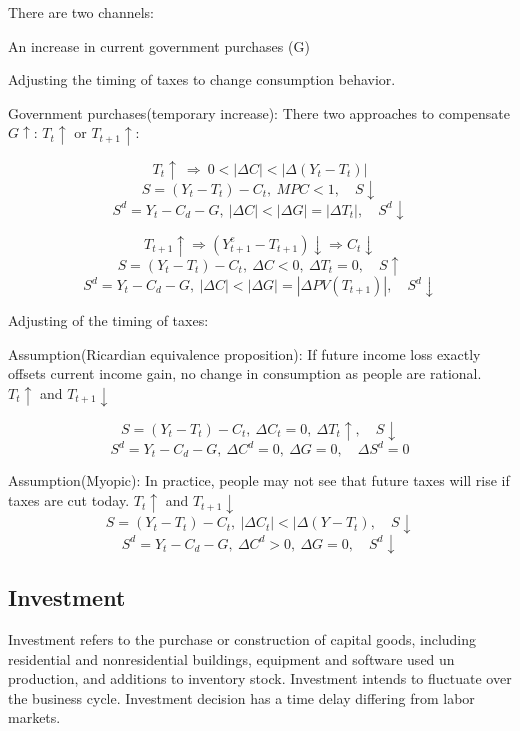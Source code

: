 \documentclass[10pt, a4paper]{article}
\begin{document}
                    There are two channels: 
                    
                    \quad An increase in current government purchases (G) 

                    \quad Adjusting the timing of taxes to change consumption behavior.

                    Government purchases(temporary increase): There two approaches to compensate $G \uparrow$: $T_t \uparrow$ or $T_{t+1} \uparrow$:
                    
                    $$T_t\uparrow \  \Rightarrow \  0 < |\Delta C| < |\Delta (Y_t - T_t)|$$
                        $$S = (Y_t - T_t) - C_t,\ MPC < 1, \quad  S\downarrow$$
                        $$S^d = Y_t - C_d - G,\ |\Delta C| < |\Delta G| = |\Delta T_t|,\quad S^d\downarrow$$


                    $$T_{t+1}\uparrow \Rightarrow (Y_{t+1}^e - T_{t+1})\downarrow \Rightarrow C_t \downarrow$$
                    $$S = (Y_t - T_t) - C_t,\ \Delta C < 0,\ \Delta T_t = 0, \quad   S\uparrow$$
                    $$S^d = Y_t - C_d - G,\ |\Delta C| < |\Delta G| = |\Delta PV(T_{t+1})|,\quad S^d\downarrow$$

                    Adjusting of the timing of taxes: 

                    \quad Assumption(Ricardian equivalence proposition): If future income loss exactly offsets current income gain, no change in consumption as people are rational. $T_t \uparrow$ and $T_{t+1} \downarrow$ 

                    $$S = (Y_t - T_t) - C_t,\ \Delta C_t = 0,\ \Delta T_t \uparrow,\quad  S \downarrow$$
                    $$S^d = Y_t - C_d - G,\ \Delta C^d = 0,\ \Delta G = 0, \quad \Delta S^d = 0$$

                    \quad Assumption(Myopic): In practice, people may  not see that future taxes will rise if taxes are cut today. $T_t \uparrow$ and $T_{t+1} \downarrow$ 
                    $$S = (Y_t - T_t) - C_t,\ |\Delta C_t| < |\Delta (Y - T_t),\quad S\downarrow$$
                    $$S^d = Y_t - C_d - G,\ \Delta C^d > 0,\ \Delta G = 0, \quad S^d\downarrow$$

        \subsection{Investment}
            Investment refers to the purchase or construction of capital goods, including residential and nonresidential buildings, equipment and software used un production, and additions to inventory stock. Investment intends to fluctuate over the business cycle. Investment decision has a time delay differing from labor markets. 
\end{document}
